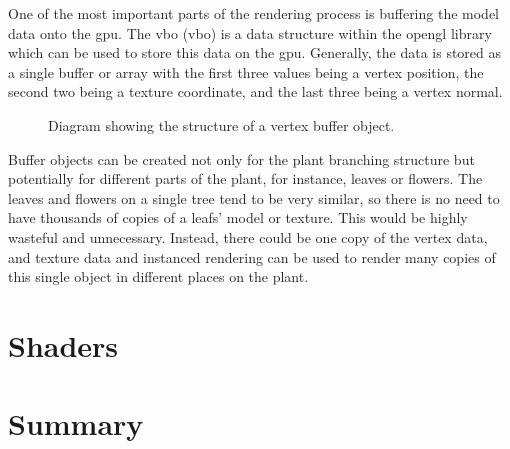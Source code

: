 One of the most important parts of the rendering process is buffering the model data onto the \acrshort{gpu}. The \acrlong{vbo} (\acrshort{vbo}) is a data structure within the \acrshort{opengl} library which can be used to store this data on the \acrshort{gpu}. Generally, the data is stored as a single buffer or array with the first three values being a vertex position, the second two being a texture coordinate, and the last three being a vertex normal.

\begin{figure}[htbp]
	{\centering
		\vspace{7px}
		\setlength{\fboxrule}{1pt}
		\caption{Diagram showing the structure of a vertex buffer object.}
	}
\end{figure}
\FloatBarrier

Buffer objects can be created not only for the plant branching structure but potentially for different parts of the plant, for instance, leaves or flowers. The leaves and flowers on a single tree tend to be very similar, so there is no need to have thousands of copies of a leafs' model or texture. This would be highly wasteful and unnecessary. Instead, there could be one copy of the vertex data, and texture data and instanced rendering can be used to render many copies of this single object in different places on the plant. 

\section{Shaders}

\section{Summary}








